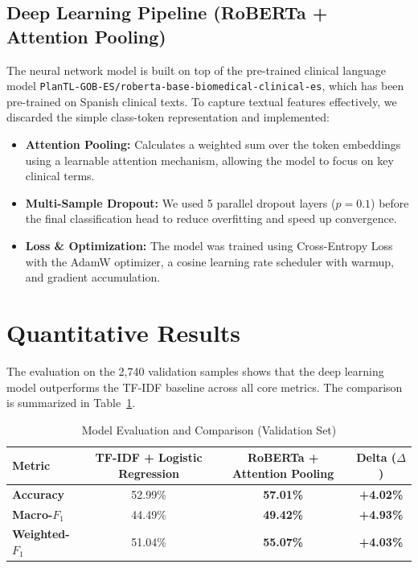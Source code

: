 \documentclass[11pt,a4paper]{article}
\begin{document}
\subsection{Deep Learning Pipeline (RoBERTa + Attention Pooling)}
The neural network model is built on top of the pre-trained clinical language model \texttt{PlanTL-GOB-ES/roberta-base-biomedical-clinical-es}, which has been pre-trained on Spanish clinical texts. To capture textual features effectively, we discarded the simple class-token representation and implemented:
\begin{itemize}
    \item \textbf{Attention Pooling:} Calculates a weighted sum over the token embeddings using a learnable attention mechanism, allowing the model to focus on key clinical terms.
    \item \textbf{Multi-Sample Dropout:} We used 5 parallel dropout layers ($p=0.1$) before the final classification head to reduce overfitting and speed up convergence.
    \item \textbf{Loss & Optimization:} The model was trained using Cross-Entropy Loss with the AdamW optimizer, a cosine learning rate scheduler with warmup, and gradient accumulation.
\end{itemize}

\section{Quantitative Results}
The evaluation on the 2,740 validation samples shows that the deep learning model outperforms the TF-IDF baseline across all core metrics. The comparison is summarized in Table~\ref{tab:comparison}.

\begin{table}[H]
\centering
\caption{Model Evaluation and Comparison (Validation Set)}
\label{tab:comparison}
\begin{tabular}{lccc}
\toprule
\textbf{Metric} & \textbf{TF-IDF + Logistic Regression} & \textbf{RoBERTa + Attention Pooling} & \textbf{Delta ($\Delta$)} \\
\midrule
\textbf{Accuracy} & 52.99\% & \textbf{57.01\%} & \textbf{+4.02\%} \\
\textbf{Macro-$F_1$} & 44.49\% & \textbf{49.42\%} & \textbf{+4.93\%} \\
\textbf{Weighted-$F_1$} & 51.04\% & \textbf{55.07\%} & \textbf{+4.03\%} \\
\bottomrule
\end{tabular}
\end{table}
\end{document}

